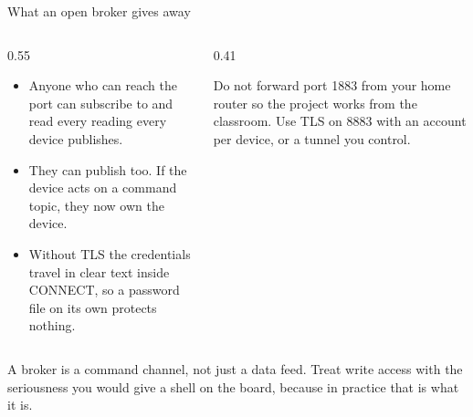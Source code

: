 \documentclass[10pt,aspectratio=169,t]{beamer}
\begin{document}
\begin{frame}[embedded,eyebrow=Trust]{What an open broker gives away}
  \vskip 2mm
  \begin{columns}[T]
    \begin{column}{0.55\textwidth}
      \begin{itemize}
        \item Anyone who can reach the port can subscribe to \code{\#} and read every reading every device publishes.
        \item They can publish too. If the device acts on a command topic, they now own the device.
        \item Without TLS the credentials travel in clear text inside CONNECT, so a password file on its own protects nothing.
      \end{itemize}
    \end{column}
    \begin{column}{0.41\textwidth}
      \begin{warning}
        Do not forward port 1883 from your home router so the project works from the classroom. Use TLS on 8883 with an account per device, or a tunnel you control.
      \end{warning}
    \end{column}
  \end{columns}
  \begin{takeaway}{A broker is a command channel, not just a data feed.}
    Treat write access with the seriousness you would give a shell on the board, because in practice that is what it is.
  \end{takeaway}
\end{frame}
\end{document}

